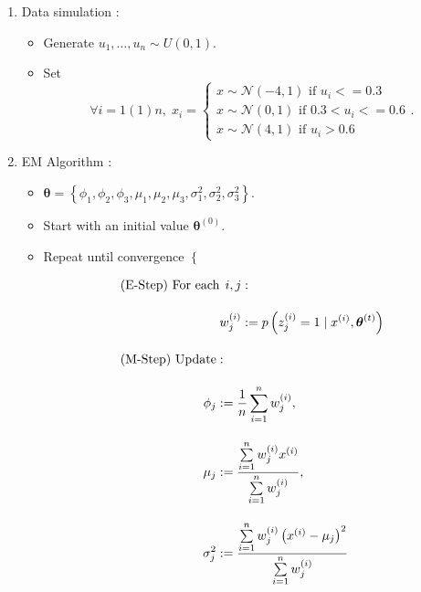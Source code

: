 \documentclass[11pt, a4paper]{article}\usepackage[]{graphicx}\usepackage[]{xcolor}
\newcommand{\bs}[1]{\boldsymbol{#1}}
\begin{document}
\begin{enumerate}

\item[\scalebox{2.0}{\twemoji{keycap: 1}}] \hspace{0.2cm} Data simulation :

\begin{itemize}
\item Generate $u_1, \ldots, u_n \sim U(0, 1)$.

\item Set $$\forall i = 1(1)n, \; x_i = \begin{cases} x \sim \mathcal{N}\!\left(-4, 1\right) \text{ if } u_i <= 0.3 \\[0.5em] x \sim \mathcal{N}\!\left(0, 1\right) \text{ if } 0.3 < u_i <= 0.6 \\[0.5em] x \sim \mathcal{N}\!\left(4, 1\right)\text{ if } u_i > 0.6 \end{cases}.$$
\end{itemize}

\newpage

\item[\scalebox{2.0}{\twemoji{keycap: 2}}] \hspace{0.2cm} EM Algorithm :

\begin{itemize}
\item $\bs{\theta} = \left\{ \phi_1, \phi_2, \phi_3, \mu_1, \mu_2, \mu_3, \sigma_1^2, \sigma_2^2, \sigma_3^2\right\}$.

\item Start with an initial value $\bs{\theta}^{(0)}$.

\item Repeat until convergence $\left\{ \right.$

\begin{align*}
&\text{(E-Step) For each} 
\begin{aligned}[t]
i, j &: \\[1em]
w_{j}^{(i)} &:= p \left( z_{j}^{(i)} = 1 \mid {x}^{(i)}, \bs{\theta}^{(t)} \right)
\end{aligned}\\[1em]
&\text{(M-Step) } 
\begin{aligned}[t]
\text{Update} &: \\[1em]
\hspace{-2em}\phi_j &:= \dfrac{1}{n} \sum \limits_{i=1}^{n}w_j^{(i)}, \\[1em]
{\mu}_j &:= \dfrac{\sum \limits_{i = 1}^{n} w_j^{(i)} {x}^{(i)}}{\sum \limits_{i = 1}^{n} w_j^{(i)}}, \\[1em]
{\sigma}_j^2 &:= \dfrac{\sum \limits_{i=1}^{n} w_j^{(i)} \left({x}^{(i)}-{\mu}_{j}\right)^2}{\sum \limits_{i=1}^{n} w_j^{(i)}}
\end{aligned}
\end{align*}


\end{itemize}
\end{enumerate}
\end{document}
